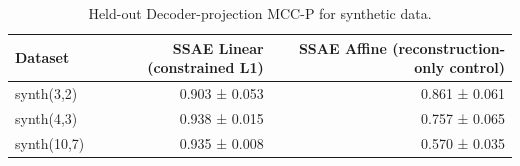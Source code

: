\begin{table}[t]
\centering
\caption{Held-out Decoder-projection MCC-P for synthetic data.}
\label{tab:synthetic-decoder-projection-mcc-p}
\begin{tabular}{lrr}
\toprule
Dataset & SSAE Linear (constrained L1) & SSAE Affine (reconstruction-only control) \\
\midrule
synth(3,2) & 0.903 ± 0.053 & 0.861 ± 0.061 \\
synth(4,3) & 0.938 ± 0.015 & 0.757 ± 0.065 \\
synth(10,7) & 0.935 ± 0.008 & 0.570 ± 0.035 \\
\bottomrule
\end{tabular}
\end{table}
